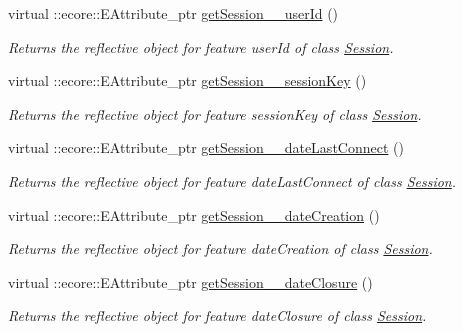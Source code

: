 \begin{DoxyCompactItemize}
virtual ::ecore::EAttribute\_\-ptr \hyperlink{classUMS__Data_1_1UMS__DataPackage_a0e58fca32f8b088e96cbc1ccf540d140}{getSession\_\-\_\-userId} ()
\begin{DoxyCompactList}\small\item\em Returns the reflective object for feature userId of class \hyperlink{classUMS__Data_1_1Session}{Session}. \item\end{DoxyCompactList}\item 
virtual ::ecore::EAttribute\_\-ptr \hyperlink{classUMS__Data_1_1UMS__DataPackage_a7a746d7283bb63cf800c696c061bbc6e}{getSession\_\-\_\-sessionKey} ()
\begin{DoxyCompactList}\small\item\em Returns the reflective object for feature sessionKey of class \hyperlink{classUMS__Data_1_1Session}{Session}. \item\end{DoxyCompactList}\item 
virtual ::ecore::EAttribute\_\-ptr \hyperlink{classUMS__Data_1_1UMS__DataPackage_afccd6bd5b51a0bd626ffa5b51eea60ae}{getSession\_\-\_\-dateLastConnect} ()
\begin{DoxyCompactList}\small\item\em Returns the reflective object for feature dateLastConnect of class \hyperlink{classUMS__Data_1_1Session}{Session}. \item\end{DoxyCompactList}\item 
virtual ::ecore::EAttribute\_\-ptr \hyperlink{classUMS__Data_1_1UMS__DataPackage_a554038853a593091555496e0aedb6685}{getSession\_\-\_\-dateCreation} ()
\begin{DoxyCompactList}\small\item\em Returns the reflective object for feature dateCreation of class \hyperlink{classUMS__Data_1_1Session}{Session}. \item\end{DoxyCompactList}\item 
virtual ::ecore::EAttribute\_\-ptr \hyperlink{classUMS__Data_1_1UMS__DataPackage_a2d19d7b1ba5d3d7d44a406b431109525}{getSession\_\-\_\-dateClosure} ()
\begin{DoxyCompactList}\small\item\em Returns the reflective object for feature dateClosure of class \hyperlink{classUMS__Data_1_1Session}{Session}. \item\end{DoxyCompactList}\item 

\end{DoxyCompactItemize}
